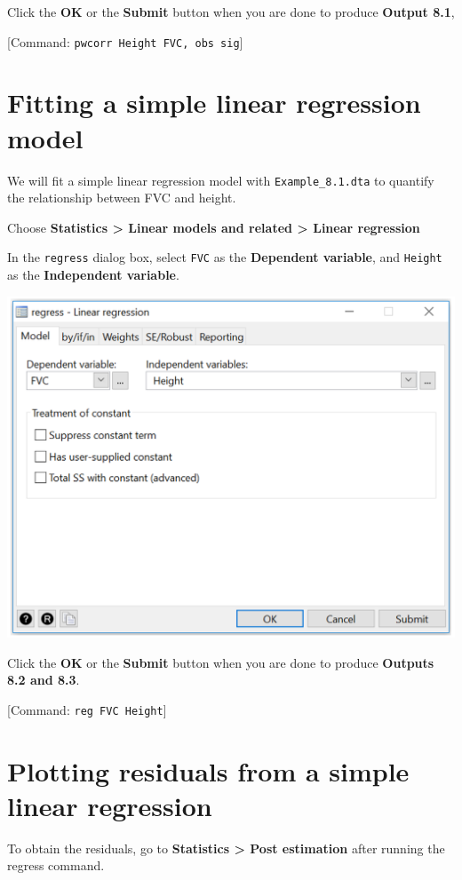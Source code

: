 \documentclass[
]{memoir}
\begin{document}
Click the \textbf{OK} or the \textbf{Submit} button when you are done to produce \textbf{Output 8.1},

{[}Command: \texttt{pwcorr\ Height\ FVC,\ obs\ sig}{]}

\hypertarget{fitting-a-simple-linear-regression-model}{%
\section{Fitting a simple linear regression model}\label{fitting-a-simple-linear-regression-model}}

We will fit a simple linear regression model with \texttt{Example\_8.1.dta} to quantify the relationship between FVC and height.

Choose \textbf{Statistics \textgreater{} Linear models and related \textgreater{} Linear regression}

In the \texttt{regress} dialog box, select \texttt{FVC} as the \textbf{Dependent variable}, and \texttt{Height} as the \textbf{Independent variable}.

\includegraphics[width=0.66\linewidth]{img/mod08/stata/regr-1}

Click the \textbf{OK} or the \textbf{Submit} button when you are done to produce \textbf{Outputs 8.2 and 8.3}.

{[}Command: \texttt{reg\ FVC\ Height}{]}

\hypertarget{plotting-residuals-from-a-simple-linear-regression}{%
\section{Plotting residuals from a simple linear regression}\label{plotting-residuals-from-a-simple-linear-regression}}

To obtain the residuals, go to \textbf{Statistics \textgreater{} Post estimation} after running the regress command.
\end{document}
